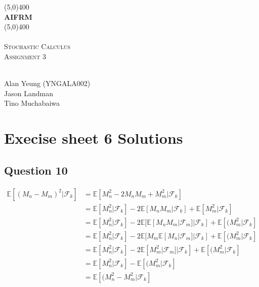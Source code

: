 \documentclass[a4paper, 12pt]{article}
\begin{document}
	
	\begin{titlepage}
		\begin{center}
				\line(5,0){400}\\
				[0.5cm]
			\huge{\bfseries AIFRM}\\
			\line(5,0){400}\\
			
			\textsc{\Large \\ Stochastic Calculus \\ Assignment 3}
			
		\end{center}
	
	
\vfill 
{}\\
\newline
Alan Yeung (YNGALA002)\\
Jason Landman\\
Tino Muchabaiwa\\

	\end{titlepage}	

\newpage
\section*{Execise sheet 6 Solutions}

\subsection*{Question 10}

\begin{align*}
\mathbb{E}[(M_n - M_m)^2|\mathcal{F}_k] &=  \mathbb{E}[M_n^2 - 2M_nM_m +M_m^2|\mathcal{F}_k] \\ &=  \mathbb{E}[M_n^2|\mathcal{F}_k] - 2\mathbb{E}[M_nM_m|\mathcal{F}_k] + \mathbb{E}[M_m^2|\mathcal{F}_k] \\ &= 
\mathbb{E}[M_n^2|\mathcal{F}_k] - 2\mathbb{E}[\mathbb{E}[M_nM_m|\mathcal{F}_m]|\mathcal{F}_k] + \mathbb{E}[(M_m^2|\mathcal{F}_k] \\&= 
\mathbb{E}[M_n^2|\mathcal{F}_k] - 2\mathbb{E}[M_m\mathbb{E}[M_n|\mathcal{F}_m]|\mathcal{F}_k] + \mathbb{E}[(M_m^2|\mathcal{F}_k] \\&= 
\mathbb{E}[M_n^2|\mathcal{F}_k] - 2\mathbb{E}[M_m^2|\mathcal{F}_m]|\mathcal{F}_k] + \mathbb{E}[(M_m^2|\mathcal{F}_k] \\&= 
\mathbb{E}[M_n^2|\mathcal{F}_k] -  \mathbb{E}[(M_m^2|\mathcal{F}_k] \\&=
\mathbb{E}[(M_n^2 - M_m^2|\mathcal{F}_k] 
\end{align*}
\end{document}
